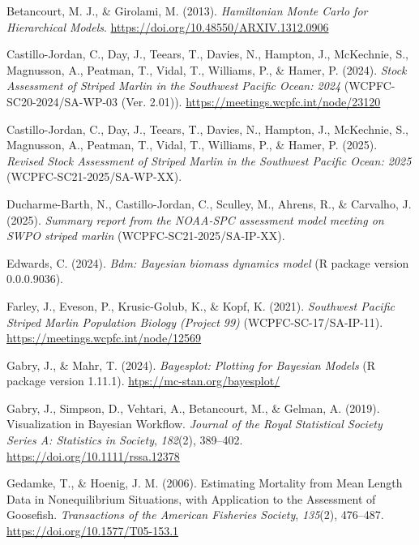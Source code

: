 \documentclass[
  11pt,
]{SCreport}
\newlength{\cslhangindent}
\newenvironment{CSLReferences}[2] %
 {\begin{list}{}{%
  \setlength{\itemindent}{0pt}
  \setlength{\leftmargin}{0pt}
  \setlength{\parsep}{0pt}
  \ifodd #1
   \setlength{\leftmargin}{\cslhangindent}
   \setlength{\itemindent}{-1\cslhangindent}
  \fi
  \setlength{\itemsep}{#2\baselineskip}}}
 {\end{list}}
\begin{document}
\label{refs}
\begin{CSLReferences}{1}{0}
Betancourt, M. J., \& Girolami, M. (2013). \emph{Hamiltonian {Monte}
{Carlo} for {Hierarchical} {Models}}.
\url{https://doi.org/10.48550/ARXIV.1312.0906}

Castillo-Jordan, C., Day, J., Teears, T., Davies, N., Hampton, J.,
McKechnie, S., Magnusson, A., Peatman, T., Vidal, T., Williams, P., \&
Hamer, P. (2024). \emph{Stock {Assessment} of {Striped} {Marlin} in the
{Southwest} {Pacific} {Ocean}: 2024} (WCPFC-SC20-2024/SA-WP-03 (Ver.
2.01)). \url{https://meetings.wcpfc.int/node/23120}

Castillo-Jordan, C., Day, J., Teears, T., Davies, N., Hampton, J.,
McKechnie, S., Magnusson, A., Peatman, T., Vidal, T., Williams, P., \&
Hamer, P. (2025). \emph{Revised {Stock} {Assessment} of {Striped}
{Marlin} in the {Southwest} {Pacific} {Ocean}: 2025}
(WCPFC-SC21-2025/SA-WP-XX).

Ducharme-Barth, N., Castillo-Jordan, C., Sculley, M., Ahrens, R., \&
Carvalho, J. (2025). \emph{Summary report from the {NOAA}-{SPC}
assessment model meeting on {SWPO} striped marlin}
(WCPFC-SC21-2025/SA-IP-XX).

Edwards, C. (2024). \emph{Bdm: {Bayesian} biomass dynamics model} (R
package version 0.0.0.9036).

Farley, J., Eveson, P., Krusic-Golub, K., \& Kopf, K. (2021).
\emph{Southwest {Pacific} {Striped} {Marlin} {Population} {Biology}
({Project} 99)} (WCPFC-SC-17/SA-IP-11).
\url{https://meetings.wcpfc.int/node/12569}

Gabry, J., \& Mahr, T. (2024). \emph{Bayesplot: {Plotting} for
{Bayesian} {Models}} (R package version 1.11.1).
\url{htps://mc-stan.org/bayesplot/}

Gabry, J., Simpson, D., Vehtari, A., Betancourt, M., \& Gelman, A.
(2019). Visualization in {Bayesian} {Workflow}. \emph{Journal of the
Royal Statistical Society Series A: Statistics in Society},
\emph{182}(2), 389--402. \url{https://doi.org/10.1111/rssa.12378}

Gedamke, T., \& Hoenig, J. M. (2006). Estimating {Mortality} from {Mean}
{Length} {Data} in {Nonequilibrium} {Situations}, with {Application} to
the {Assessment} of {Goosefish}. \emph{Transactions of the American
Fisheries Society}, \emph{135}(2), 476--487.
\url{https://doi.org/10.1577/T05-153.1}


\end{CSLReferences}
\end{document}
